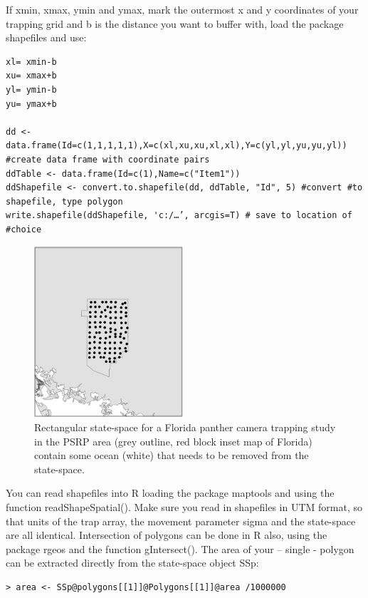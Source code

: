 If xmin, xmax, ymin and ymax, mark the outermost x and y coordinates of your trapping grid and b is the distance you want to buffer with, load the package shapefiles \citep{stabler:2006} and use:
\begin{verbatim}
xl= xmin-b
xu= xmax+b
yl= ymin-b
yu= ymax+b

dd <- data.frame(Id=c(1,1,1,1,1),X=c(xl,xu,xu,xl,xl),Y=c(yl,yl,yu,yu,yl)) #create data frame with coordinate pairs
ddTable <- data.frame(Id=c(1),Name=c("Item1"))
ddShapefile <- convert.to.shapefile(dd, ddTable, "Id", 5) #convert #to shapefile, type polygon
write.shapefile(ddShapefile, 'c:/…’, arcgis=T) # save to location of #choice
\end{verbatim}


\begin{figure}
\begin{center}
\includegraphics[height=2.5in]{figs/panthercamera}
\end{center}
\caption{Rectangular state-space for a Florida panther camera trapping
study in the PSRP area (grey outline, red block inset map of Florida)
contain some ocean (white) that needs to be removed from the state-space.} 
\label{pantercamera.fig}
\end{figure}

You can read shapefiles into R loading the package maptools
\citep{lewin-koh_etal:2011} and using the function
readShapeSpatial(). Make sure you read in shapefiles in UTM format, so
that units of the trap array, the movement parameter sigma and the
state-space are all identical.  Intersection of polygons can be done
in R also, using the package rgeos \citep{bivand_rundel:2011} and the
function gIntersect(). The area of your – single - polygon can be
extracted directly from the state-space object SSp:

\begin{verbatim}
> area <- SSp@polygons[[1]]@Polygons[[1]]@area /1000000
\end{verbatim}

